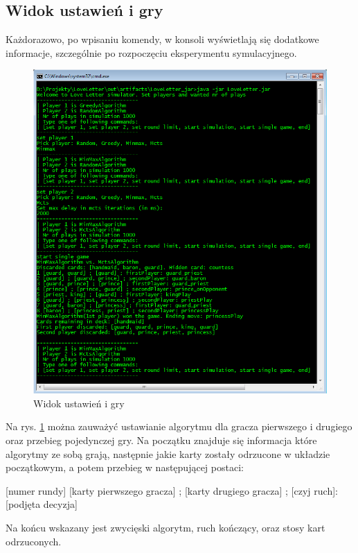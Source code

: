 \subsection*{Widok ustawień i gry}
Każdorazowo, po wpisaniu komendy, w konsoli wyświetlają się dodatkowe informacje, szczególnie po rozpoczęciu eksperymentu symulacyjnego.
\begin{figure}[H]
	\centering
	\includegraphics[width=\textwidth]{Resources/cli2.PNG}
	\caption{Widok ustawień i gry} 
	\label{fig:cli2}
\end{figure}

Na rys. \ref{fig:cli2} można zauważyć ustawianie algorytmu dla gracza pierwszego i drugiego oraz przebieg pojedynczej gry. Na początku znajduje się informacja które algorytmy ze sobą grają, następnie jakie karty zostały odrzucone w układzie początkowym, a potem przebieg w następującej postaci:
\begin{center}
	[numer rundy] [karty pierwszego gracza] ; [karty drugiego gracza] ; [czyj ruch]: [podjęta decyzja]
\end{center}
Na końcu wskazany jest zwycięski algorytm, ruch kończący, oraz stosy kart odrzuconych.


